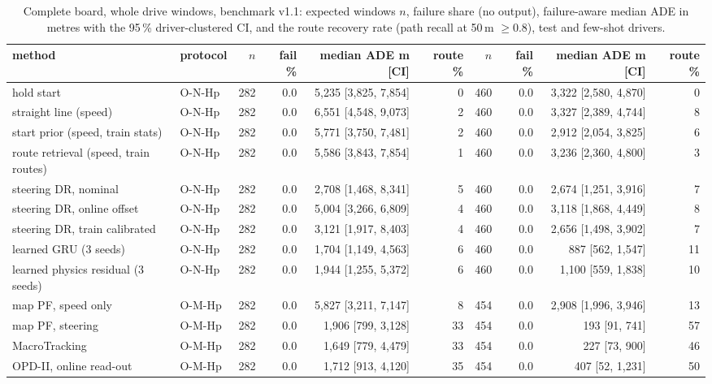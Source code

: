 \begin{table}[t]\centering\scriptsize\setlength{\tabcolsep}{3pt}
\caption{Complete board, whole drive windows, benchmark v1.1: expected windows $n$, failure share (no output), failure-aware median ADE in metres with the 95\,\% driver-clustered CI, and the route recovery rate (path recall at 50\,m $\ge 0.8$), test and few-shot drivers.}\label{tab:supp_main_full}
\begin{tabular}{llrrrrrrrr}\toprule
method & protocol & $n$ & fail \% & median ADE m [CI] & route \% & $n$ & fail \% & median ADE m [CI] & route \% \\\midrule
hold start & O-N-Hp & 282 & 0.0 & 5{,}235 [3{,}825, 7{,}854] & 0 & 460 & 0.0 & 3{,}322 [2{,}580, 4{,}870] & 0 \\
straight line (speed) & O-N-Hp & 282 & 0.0 & 6{,}551 [4{,}548, 9{,}073] & 2 & 460 & 0.0 & 3{,}327 [2{,}389, 4{,}744] & 8 \\
start prior (speed, train stats) & O-N-Hp & 282 & 0.0 & 5{,}771 [3{,}750, 7{,}481] & 2 & 460 & 0.0 & 2{,}912 [2{,}054, 3{,}825] & 6 \\
route retrieval (speed, train routes) & O-N-Hp & 282 & 0.0 & 5{,}586 [3{,}843, 7{,}854] & 1 & 460 & 0.0 & 3{,}236 [2{,}360, 4{,}800] & 3 \\
steering DR, nominal & O-N-Hp & 282 & 0.0 & 2{,}708 [1{,}468, 8{,}341] & 5 & 460 & 0.0 & 2{,}674 [1{,}251, 3{,}916] & 7 \\
steering DR, online offset & O-N-Hp & 282 & 0.0 & 5{,}004 [3{,}266, 6{,}809] & 4 & 460 & 0.0 & 3{,}118 [1{,}868, 4{,}449] & 8 \\
steering DR, train calibrated & O-N-Hp & 282 & 0.0 & 3{,}121 [1{,}917, 8{,}403] & 4 & 460 & 0.0 & 2{,}656 [1{,}498, 3{,}902] & 7 \\
learned GRU (3 seeds) & O-N-Hp & 282 & 0.0 & 1{,}704 [1{,}149, 4{,}563] & 6 & 460 & 0.0 & 887 [562, 1{,}547] & 11 \\
learned physics residual (3 seeds) & O-N-Hp & 282 & 0.0 & 1{,}944 [1{,}255, 5{,}372] & 6 & 460 & 0.0 & 1{,}100 [559, 1{,}838] & 10 \\
map PF, speed only & O-M-Hp & 282 & 0.0 & 5{,}827 [3{,}211, 7{,}147] & 8 & 454 & 0.0 & 2{,}908 [1{,}996, 3{,}946] & 13 \\
map PF, steering & O-M-Hp & 282 & 0.0 & 1{,}906 [799, 3{,}128] & 33 & 454 & 0.0 & 193 [91, 741] & 57 \\
MacroTracking & O-M-Hp & 282 & 0.0 & 1{,}649 [779, 4{,}479] & 33 & 454 & 0.0 & 227 [73, 900] & 46 \\
OPD-II, online read-out & O-M-Hp & 282 & 0.0 & 1{,}712 [913, 4{,}120] & 35 & 454 & 0.0 & 407 [52, 1{,}231] & 50 \\

\end{tabular}
\end{table}
